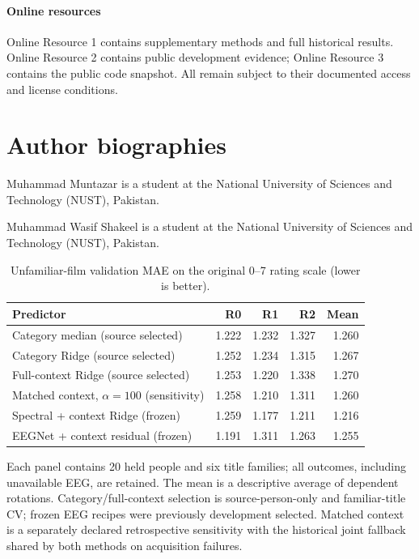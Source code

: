 \documentclass[12pt,a4paper]{article}
\begin{document}
\paragraph{Online resources} Online Resource 1 contains supplementary methods and full historical results. Online Resource 2 contains public development evidence; Online Resource 3 contains the public code snapshot. All remain subject to their documented access and license conditions.
\section*{Author biographies}
Muhammad Muntazar is a student at the National University of Sciences and Technology (NUST), Pakistan.

Muhammad Wasif Shakeel is a student at the National University of Sciences and Technology (NUST), Pakistan.

\begingroup\singlespacing\small{}

\endgroup
\clearpage
\begin{table}[p]
\centering
\small
\caption{Unfamiliar-film validation MAE on the original 0--7 rating scale (lower is better).}
\label{tab:primary}
\begin{tabular}{lrrrr}
\toprule
Predictor & R0 & R1 & R2 & Mean \\
\midrule
Category median (source selected) & 1.222 & 1.232 & 1.327 & 1.260 \\
Category Ridge (source selected) & 1.252 & 1.234 & 1.315 & 1.267 \\
Full-context Ridge (source selected) & 1.253 & 1.220 & 1.338 & 1.270 \\
Matched context, $\alpha=100$ (sensitivity) & 1.258 & 1.210 & 1.311 & 1.260 \\
Spectral + context Ridge (frozen) & 1.259 & 1.177 & 1.211 & 1.216 \\
EEGNet + context residual (frozen) & 1.191 & 1.311 & 1.263 & 1.255 \\
\bottomrule
\end{tabular}
\par\medskip\begin{minipage}{0.97\linewidth}\footnotesize Each panel contains 20 held people and six title families; all outcomes, including unavailable EEG, are retained. The mean is a descriptive average of dependent rotations. Category/full-context selection is source-person-only and familiar-title CV; frozen EEG recipes were previously development selected. Matched context is a separately declared retrospective sensitivity with the historical joint fallback shared by both methods on acquisition failures.\end{minipage}
\end{table}
\end{document}

